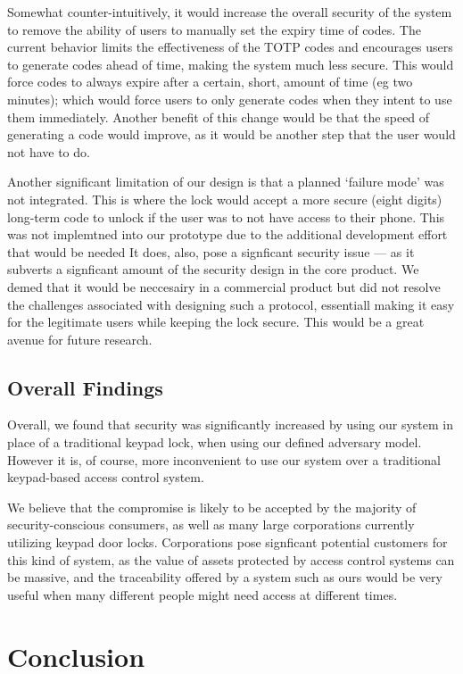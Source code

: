 \documentclass[conference]{IEEEtran}
\begin{document}
Somewhat counter-intuitively, it would increase the overall security of the system to remove the ability of users to manually set the expiry time of codes.
The current behavior limits the effectiveness of the TOTP codes and encourages users to generate codes ahead of time, making the system much less secure.
This would force codes to always expire after a certain, short, amount of time (eg two minutes); which would force users to only generate codes when they intent to use them immediately.
Another benefit of this change would be that the speed of generating a code would improve, as it would be another step that the user would not have to do.

Another significant limitation of our design is that a planned `failure mode' was not integrated. This is where the lock would accept a more secure (eight digits) long-term code to unlock if the user was to not have access to their phone.
This was not implemtned into our prototype due to the additional development effort that would be needed
It does, also, pose a signficant security issue --- as it subverts a signficant amount of the security design in the core product.
We demed that it would be neccesairy in a commercial product but did not resolve the challenges associated with designing such a protocol, essentiall making it easy for the legitimate users while keeping the lock secure.
This would be a great avenue for future research.

\subsection{Overall Findings}
Overall, we found that security was significantly increased by using our system in place of a traditional keypad lock, when using our defined adversary model.
However it is, of course, more inconvenient to use our system over a traditional keypad-based access control system. 

We believe that the compromise is likely to be accepted by the majority of security-conscious consumers, as well as many large corporations currently utilizing keypad door locks.
Corporations pose signficant potential customers for this kind of system, as the value of assets protected by access control systems can be massive, and the traceability offered by a system such as ours would be very useful when many different people might need access at different times.



\section{Conclusion}
\end{document}
